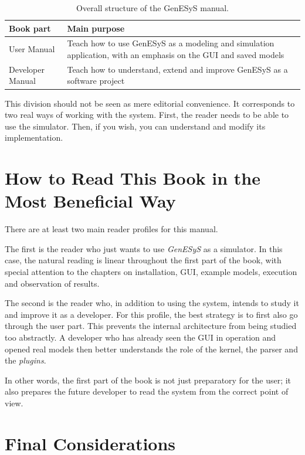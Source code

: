 \begin{table}[htbp]
\centering
 \caption{Overall structure of the GenESyS manual.}
 \label{tab:cap1_estrutura_manual}
\small
 \begin{tabular}{|p{3.0cm}|p{8.4cm}|}
\hline
\textbf{Book part} & \textbf{Main purpose} \\
\hline
User Manual & Teach how to use GenESyS as a modeling and simulation application, with an emphasis on the GUI and saved models \\
\hline
Developer Manual & Teach how to understand, extend and improve GenESyS as a software project \\
\hline
 \end{tabular}
\end{table}

This division should not be seen as mere editorial convenience. It corresponds to two real ways of working with the system. First, the reader needs to be able to use the simulator. Then, if you wish, you can understand and modify its implementation.

\section{How to Read This Book in the Most Beneficial Way}
\label{sec:cap1_como_ler_livro}

There are at least two main reader profiles for this manual.

The first is the reader who just wants to use \textit{GenESyS} as a simulator. In this case, the natural reading is linear throughout the first part of the book, with special attention to the chapters on installation, GUI, example models, execution and observation of results.

The second is the reader who, in addition to using the system, intends to study it and improve it as a developer. For this profile, the best strategy is to first also go through the user part. This prevents the internal architecture from being studied too abstractly. A developer who has already seen the GUI in operation and opened real models then better understands the role of the kernel, the parser and the \textit{plugins}.

In other words, the first part of the book is not just preparatory for the user; it also prepares the future developer to read the system from the correct point of view.

\section{Final Considerations}
\label{sec:cap1_consideracoes_finais}

